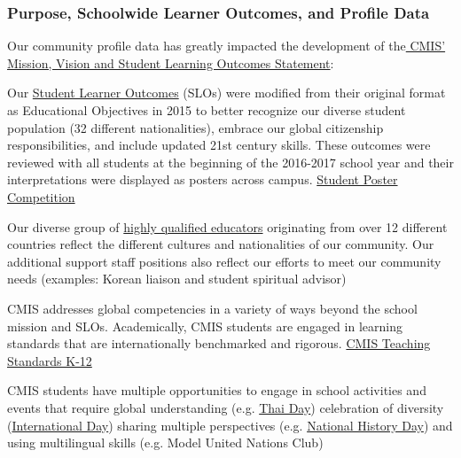 \subsubsection{Purpose, Schoolwide Learner Outcomes, and Profile Data}



\begin{findings}
Our community profile data has greatly impacted the development of the\href{http://cmis.ac.th/about/vision}{ CMIS’ Mission, Vision and Student Learning Outcomes Statement}:

Our \href{https://docs.google.com/document/d/1bIbV9pgGz2vpXYJdnRzL_Od5PS35egy7lgBOBuszgD4/edit}{Student Learner Outcomes} (SLOs) were modified from their original format as Educational Objectives in 2015 to better recognize our diverse student population (32 different nationalities), embrace our global citizenship responsibilities, and include updated 21st century skills. These outcomes were reviewed with all students at the beginning of the 2016-2017 school year and their interpretations were displayed as posters across campus. \href{https://docs.google.com/a/cmis.ac.th/presentation/d/1bdi1LZUjWbGKOyB0XR9CGyoY2xLY39SZVKhiHTIJGxc/edit?usp=sharing}{Student Poster Competition}

Our diverse group of \href{http://www.cmis.ac.th/about/faculty}{highly qualified educators} originating from over 12 different countries reflect the different cultures and nationalities of our community. Our additional support staff positions also reflect our efforts to meet our community needs (examples: Korean liaison and student spiritual advisor)

CMIS addresses global competencies in a variety of ways beyond the school mission and SLOs. Academically, CMIS students are engaged in learning standards that are internationally benchmarked and rigorous. \href{https://drive.google.com/drive/folders/0ByVFfrm0zfolMVRQYmI1aGlRNDQ}{CMIS Teaching Standards K-12}

CMIS students have multiple opportunities to engage in school activities and events that require global understanding (e.g. \href{http://gallery.cmis.ac.th/zp-core/full-image.php?a=2010-2011/thai-day-2011/website&i=_mg_3802-version-2.jpg&q=100&wmk=\%21&dsp=Protected\%20view&check=788a1e55c231186711f8dcc0876f4efd0daa0880}{Thai Day}) celebration of diversity (\href{http://gallery.cmis.ac.th/zp-core/full-image.php?a=2013-2014/international_day&i=_MG_6129.jpg&q=100&wmk=\%21&dsp=Protected\%20view&check=788a1e55c231186711f8dcc0876f4efd0daa0880}{International Day}) sharing multiple perspectives (e.g. \href{https://www.nhd.org/}{National History Day}) and using multilingual skills (e.g. Model United Nations Club) 


\end{findings}
